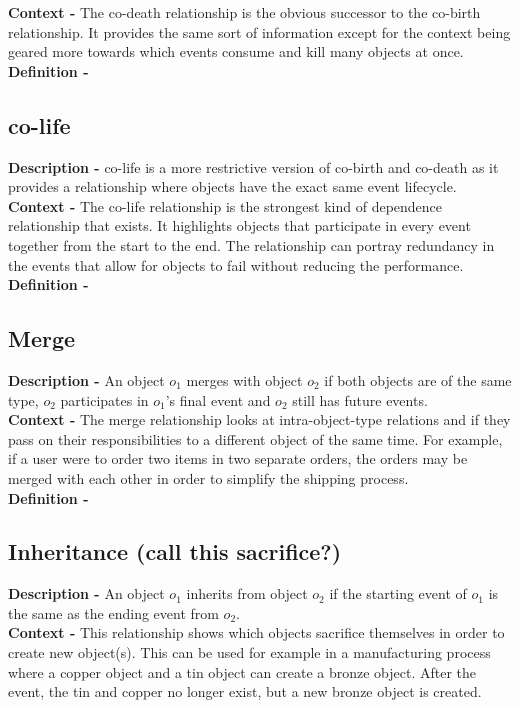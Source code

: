 \documentclass{article}
\begin{document}
\noindent\textbf{Context -} The co-death relationship is the obvious successor to the co-birth relationship. It provides the same sort of information except for the context being geared more towards which events consume and kill many objects at once.\\

\noindent\textbf{Definition -}
\subsection{co-life}
\noindent\textbf{Description -} co-life is a more restrictive version of co-birth and co-death as it provides a relationship where objects have the exact same event lifecycle. \\

\noindent\textbf{Context -} The co-life relationship is the strongest kind of dependence relationship that exists. It highlights objects that participate in every event together from the start to the end. The relationship can portray redundancy in the events that allow for objects to fail without reducing the performance.\\


\noindent\textbf{Definition -}
\subsection{Merge}
\noindent\textbf{Description -} An object $o_1$ merges with object $o_2$ if both objects are of the same type, $o_2$ participates in $o_1$'s final event and $o_2$ still has future events. \\

\noindent\textbf{Context -} The merge relationship looks at intra-object-type relations and if they pass on their responsibilities to a different object of the same time. For example, if a user were to order two items in two separate orders, the orders may be merged with each other in order to simplify the shipping process.\\


\noindent\textbf{Definition -}
\subsection{Inheritance (call this sacrifice?)}
\noindent\textbf{Description -} An object $o_1$ inherits from object $o_2$ if the starting event of $o_1$ is the same as the ending event from $o_2$.\\

\noindent\textbf{Context -} This relationship shows which objects sacrifice themselves in order to create new object(s). This can be used for example in a manufacturing process where a copper object and a tin object can create a bronze object. After the event, the tin and copper no longer exist, but a new bronze object is created.\\
\end{document}

